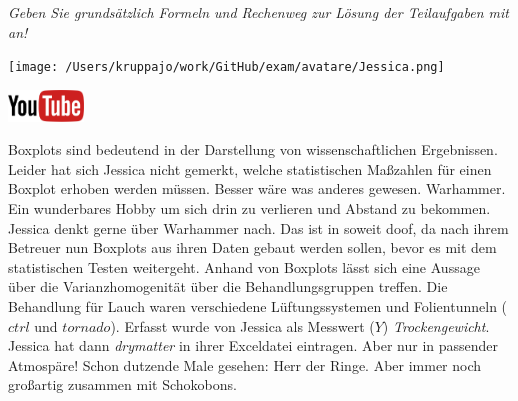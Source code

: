 \documentclass[a4paper, 9pt]{scrartcl}\usepackage[]{graphicx}\usepackage[]{xcolor}
\begin{document}
\textit{Geben Sie grundsätzlich Formeln und Rechenweg zur Lösung der Teilaufgaben mit an!} \\[1Ex]
 

 
\begin{minipage}[t]{0.5\textwidth}
\texttt{[image: /Users/kruppajo/work/GitHub/exam/avatare/Jessica.png]}
\end{minipage}
\begin{minipage}[t]{0.5\textwidth}
\hfill
\href{https://youtu.be/0xc0jIPeiyw}{\includegraphics[width = 2cm]{img/youtube}}\\[1Ex]
\end{minipage}
\vspace{1ex}



Boxplots sind bedeutend in der Darstellung von wissenschaftlichen Ergebnissen. Leider hat sich Jessica nicht gemerkt, welche statistischen Maßzahlen für einen Boxplot erhoben werden müssen. Besser wäre was anderes gewesen. Warhammer. Ein wunderbares Hobby um sich drin zu verlieren und Abstand zu bekommen. Jessica denkt gerne über Warhammer nach. Das ist in soweit doof, da nach ihrem Betreuer nun Boxplots aus ihren Daten gebaut werden sollen, bevor es mit dem statistischen Testen weitergeht. Anhand von Boxplots lässt sich eine Aussage über die Varianzhomogenität über die Behandlungsgruppen treffen. Die Behandlung für Lauch waren verschiedene Lüftungssystemen und Folientunneln ($ctrl$ und $tornado$). Erfasst wurde von Jessica als Messwert ($Y$) \textit{Trockengewicht}. Jessica hat dann \textit{drymatter} in ihrer Exceldatei eintragen. Aber nur in passender Atmospäre! Schon dutzende Male gesehen: Herr der Ringe. Aber immer noch großartig zusammen mit Schokobons.
\end{document}
